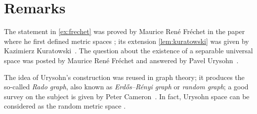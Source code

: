 \section{Remarks}

The statement in \ref{ex:frechet} was proved by Maurice René Fréchet in the paper where he first defined metric spaces \cite{frechet};
its extension \ref{lem:kuratowski} was given by Kazimierz Kuratowski~\cite{kuratowski}.
The question about the existence of a separable universal space was posted by Maurice René Fréchet and answered by
Pavel Urysohn~\cite{urysohn}.

The idea of Urysohn's construction was reused in graph theory; it produces the so-called {}\emph{Rado graph},
also known as {}\emph{Erd\H{o}s–R\'enyi graph} or \emph{random graph}; a good survey on the subject is given by Peter Cameron~\cite{cameron}.
In fact, Urysohn space can be considered as the random metric space \cite{vershik}.



